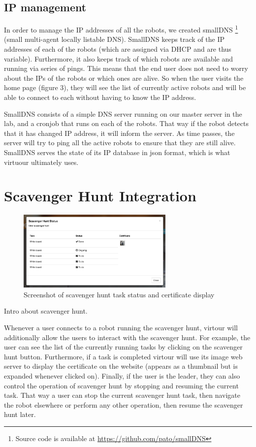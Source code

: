 \documentclass[
  oneside,
  11pt, a4paper,
  footinclude=true,
  headinclude=true,
  cleardoublepage=empty
]{article}
\begin{document}
\subsection{IP management}

In order to manage the IP addresses of all the robots, we created smallDNS
\footnote{Source code is available at \url{https://github.com/pato/smallDNS}}
(small multi-agent locally listable DNS). SmallDNS keeps track of the IP
addresses of each of the robots (which are assigned via DHCP and are thus
variable). Furthermore, it also keeps track of which robots are available and
running via series of pings. This means that the end user does not need to
worry about the IPs of the robots or which ones are alive. So when the user
visits the home page (figure 3), they will see the list of currently active
robots and will be able to connect to each without having to know the IP
address.

SmallDNS consists of a simple DNS server running on our master server in the
lab, and a cronjob that runs on each of the robots. That way if the robot
detects that it has changed IP address, it will inform the server. As time
passes, the server will try to ping all the active robots to ensure that they
are still alive. SmallDNS serves the state of its IP database in json
format, which is what virtuour ultimately uses.

\section{Scavenger Hunt Integration}

\begin{figure}
\centering
\includegraphics[width=3in]{scav_certs}
\caption{Screenshot of scavenger hunt task status and certificate display}
\end{figure}

Intro about scavenger hunt.

Whenever a user connects to a robot running the scavenger hunt, virtour will
additionally allow the users to interact with the scavenger hunt. For example,
the user can see the list of the currently running tasks by clicking on the
scavenger hunt button. Furthermore, if a task is completed virtour will use
its image web server to display the certificate on the website (appears as a
thumbnail but is expanded whenever clicked on). Finally, if the user is the
leader, they can also control the operation of scavenger hunt by stopping and
resuming the current task. That way a user can stop the current scavenger hunt
task, then navigate the robot elsewhere or perform any other operation, then
resume the scavenger hunt later.
\end{document}
